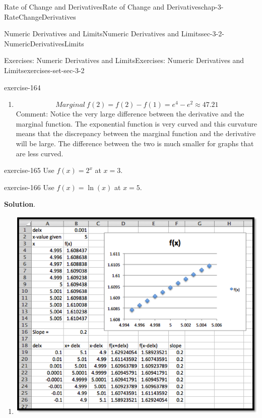 \documentclass[oneside,10pt,]{book}
\numberwithin{equation}{section}
\begin{document}
\begin{chapterptx}{Rate of Change and Derivatives}{}{Rate of Change and Derivatives}{}{}{chap-3-RateChangeDerivatives}
\begin{sectionptx}{Numeric Derivatives and Limits}{}{Numeric Derivatives and Limits}{}{}{sec-3-2-NumericDerivativesLimits}
\begin{exercises-subsection-numberless}{Exercises: Numeric Derivatives and Limits}{}{Exercises: Numeric Derivatives and Limits}{}{}{exercises-set-sec-3-2}
\begin{exercisegroup}
\begin{divisionexerciseeg}{7}{}{}{exercise-164}
\begin{enumerate}[label=(\alph*)]
\item\hypertarget{li-336}{}\hypertarget{p-1089}{}%
%
\begin{equation*}
Marginal\ f(2)=f(2)-f(1)=e^4-e^2\approx 47.21
\end{equation*}
Comment: Notice the very large difference between the derivative and the marginal function. The exponential function is very curved and this curvature means that the discrepancy between the marginal function and the derivative will be large. The difference between the two is much smaller for graphs that are less curved.%
\end{enumerate}
\end{divisionexerciseeg}%
\begin{divisionexerciseeg}{8}{}{}{exercise-165}%
\hypertarget{p-1090}{}%
Use \(f(x)=2^x\) at \(x=3\).%
\end{divisionexerciseeg}%
\begin{divisionexerciseeg}{9}{}{}{exercise-166}%
\hypertarget{p-1091}{}%
Use \(f(x)=\ln(x)\) at \(x=5\).%
\par\smallskip%
\noindent\textbf{Solution}.\hypertarget{solution-82}{}\quad%
\leavevmode%
\begin{enumerate}[label=(\alph*)]
\item\hypertarget{li-337}{}\leavevmode%
\begin{sidebyside}{1}{0.05}{0.05}{0}%
\begin{sbspanel}{0.9}%
\includegraphics[width=1\linewidth]{images/sec3-2-sol9a.png}
\end{sbspanel}%

\end{sidebyside}
\end{enumerate}
\end{divisionexerciseeg}
\end{exercisegroup}
\end{exercises-subsection-numberless}
\end{sectionptx}
\end{chapterptx}
\end{document}
